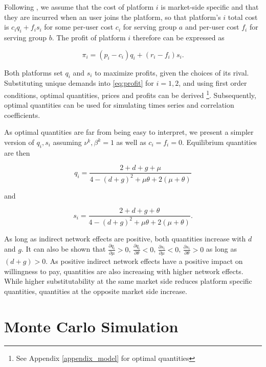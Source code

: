\documentclass[12pt,a4paper]{scrreprt}
\begin{document}
Following \cite{armstrong_competition_2006}, we assume that the cost of platform $i$ is market-side specific and that they are incurred when an user joins the platform, so that platform's $i$ total cost is $c_i q_i+f_i s_i$ for some per-user cost $c_i$ for serving group $a$ and per-user cost $f_i$ for serving group $b$. The profit of platform $i$ therefore can be expressed as 

\begin{equation}\label{eq:profit}
\pi_i=(p_i-c_i)q_i+(r_i-f_i)s_i.
\end{equation}

Both platforms set $q_i$ and $s_i$ to maximize profits, given the choices of its rival. Substituting unique demands into \ref{eq:profit} for $i=1,2$, and using first order conditions, optimal quantities, prices and profits can be derived \footnote{See Appendix \ref{appendix_model} for optimal quantities}. Subsequently, optimal quantities can be used for simulating times series and correlation coefficients. 


 As optimal quantities are far from being easy to interpret, we present a simpler version of $q_i, s_i$ assuming $\nu^k, \beta^k=1$  as well as $c_i=f_i=0$. Equilibrium quantities are then

\begin{equation}\label{eq_quantities1}
	q_i=\frac{2+d+g+\mu}{4-(d+g)^2+\mu\theta+2(\mu+\theta)}
\end{equation}

and

\begin{equation}\label{eq_quantities2}
	s_i=\frac{2+d+g+\theta}{4-(d+g)^2+\mu\theta+2(\mu+\theta)}.
\end{equation}

As long as indirect network effects are positive, both quantities increase with $d$ and $g$. It can also be shown that $\frac{\partial q_i}{\partial \mu}>0$, $\frac{\partial q_i}{\partial \theta}<0$, $\frac{\partial s_i}{\partial \mu}<0$, $\frac{\partial s_i}{\partial \theta}>0$ as long as $(d+g)>0$. As positive indirect network effects have a positive impact on willingness to pay, quantities are also increasing with higher network effects. While higher substitutability at the same market side reduces platform specific quantities, quantities at the opposite market side increase.  


\chapter{Monte Carlo Simulation}
\end{document}
